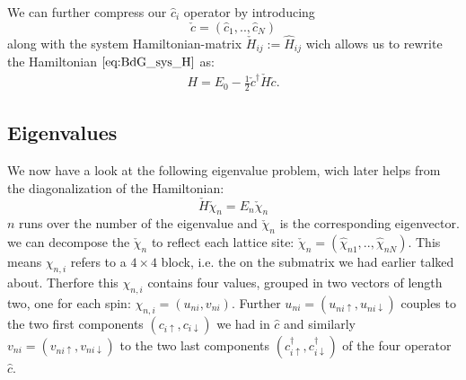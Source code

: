 \documentclass[../main.tex]{subfile}
\begin{document}
We can further compress our $\hat{c}_i$ operator by introducing 
\[
    \check{c} = (\hat{c}_1,..,\hat{c}_N)
\] 
along with the system Hamiltonian-matrix $\check{H}_{ij} := \hat{H}_{ij}$ wich allows us to rewrite the Hamiltonian $\ref{eq:BdG_sys_H}$ as:
\begin{align}
    H = E_0 - \frac{1}{2} \check{c}^\dagger \check{H} \check{c}.
\end{align}
\subsection{Eigenvalues}
We now have a look at the following eigenvalue problem, wich later helps from the diagonalization of the Hamiltonian:
\[
    \check{H} \check{\chi}_n = E_n \check{\chi}_n
\]
$n$ runs over the number of the eigenvalue and $\check{\chi}_n$ is the corresponding eigenvector.
we can decompose the $\check{\chi}_n$ to reflect each lattice site: $\check{\chi}_n = (\hat{\chi}_{n1},..,\hat{\chi}_{nN})$. 
This means $\chi_{n,i}$ refers to a $4\times4$ block, i.e. the on the submatrix we had earlier talked about.
Therfore this $\chi_{n,i}$ contains four values, grouped in two vectors of length two, one for each spin: $\chi_{n,i} = (u_{ni}, v_{ni})$.
Further $u_{ni} = (u_{ni\uparrow}, u_{ni\downarrow})$ couples to the two first components $(c_{i\uparrow},c_{i\downarrow})$ we had in $\hat{c}$ and 
similarly $v_{ni} = (v_{ni\uparrow}, v_{ni\downarrow})$ to the two last components $(c_{i\uparrow}^{\dagger},c_{i\downarrow}^{\dagger})$ of
the four operator $\hat{c}$.\\ 
\end{document}
